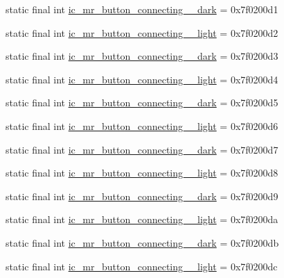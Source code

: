 \begin{CompactItemize}
\item 
static final int \hyperlink{classandroid_1_1support_1_1v7_1_1appcompat_1_1_r_1_1drawable_5cb796d42d0af1aa119bbbb43c366d63}{ic\_\-mr\_\-button\_\-connecting\_\_\-dark} = 0x7f0200d1
\item 
static final int \hyperlink{classandroid_1_1support_1_1v7_1_1appcompat_1_1_r_1_1drawable_3f7c964073e3af8f048e52688083647b}{ic\_\-mr\_\-button\_\-connecting\_\_\-light} = 0x7f0200d2
\item 
static final int \hyperlink{classandroid_1_1support_1_1v7_1_1appcompat_1_1_r_1_1drawable_f24ff621bdeb484e65e1598082bcdd50}{ic\_\-mr\_\-button\_\-connecting\_\_\-dark} = 0x7f0200d3
\item 
static final int \hyperlink{classandroid_1_1support_1_1v7_1_1appcompat_1_1_r_1_1drawable_3651f2598618fe70db8069361c04499d}{ic\_\-mr\_\-button\_\-connecting\_\_\-light} = 0x7f0200d4
\item 
static final int \hyperlink{classandroid_1_1support_1_1v7_1_1appcompat_1_1_r_1_1drawable_032e8e7ceee11a4b2f32e10b78e31d69}{ic\_\-mr\_\-button\_\-connecting\_\_\-dark} = 0x7f0200d5
\item 
static final int \hyperlink{classandroid_1_1support_1_1v7_1_1appcompat_1_1_r_1_1drawable_cc0a34bdb6ace44a20cc5fead93af96d}{ic\_\-mr\_\-button\_\-connecting\_\_\-light} = 0x7f0200d6
\item 
static final int \hyperlink{classandroid_1_1support_1_1v7_1_1appcompat_1_1_r_1_1drawable_a782677073a6d8513539674dae4ed549}{ic\_\-mr\_\-button\_\-connecting\_\_\-dark} = 0x7f0200d7
\item 
static final int \hyperlink{classandroid_1_1support_1_1v7_1_1appcompat_1_1_r_1_1drawable_653b5321271d51474fc0409d2ab375d8}{ic\_\-mr\_\-button\_\-connecting\_\_\-light} = 0x7f0200d8
\item 
static final int \hyperlink{classandroid_1_1support_1_1v7_1_1appcompat_1_1_r_1_1drawable_bfdcb7e7e2f55b23074478288b43df4f}{ic\_\-mr\_\-button\_\-connecting\_\_\-dark} = 0x7f0200d9
\item 
static final int \hyperlink{classandroid_1_1support_1_1v7_1_1appcompat_1_1_r_1_1drawable_1e0c62aaff66215a1a4fc3a39bc3008e}{ic\_\-mr\_\-button\_\-connecting\_\_\-light} = 0x7f0200da
\item 
static final int \hyperlink{classandroid_1_1support_1_1v7_1_1appcompat_1_1_r_1_1drawable_0086162644dfe4c0497fabd14b208b71}{ic\_\-mr\_\-button\_\-connecting\_\_\-dark} = 0x7f0200db
\item 
static final int \hyperlink{classandroid_1_1support_1_1v7_1_1appcompat_1_1_r_1_1drawable_bdd77fe4a7a67d2402b712cf0a044512}{ic\_\-mr\_\-button\_\-connecting\_\_\-light} = 0x7f0200dc

\end{CompactItemize}
